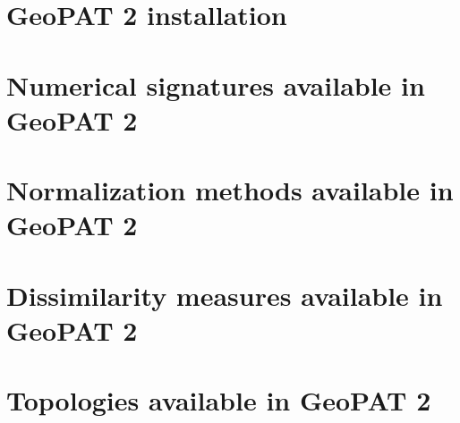 \documentclass[a4paper, 11pt]{book}
\begin{document}
\FloatBarrier

\begin{appendices}

\chapter{GeoPAT 2 installation}


\chapter{Numerical signatures available in GeoPAT 2 \label{signatures}} 


\chapter{Normalization methods available in GeoPAT 2 \label{normalization}} 


\chapter{Dissimilarity measures available in GeoPAT 2 \label{measures}}


\chapter{Topologies available in GeoPAT 2 \label{topology}}


\end{appendices}

\newpage

\printbibliography[heading=bibintoc,title={References}]
\end{document}
